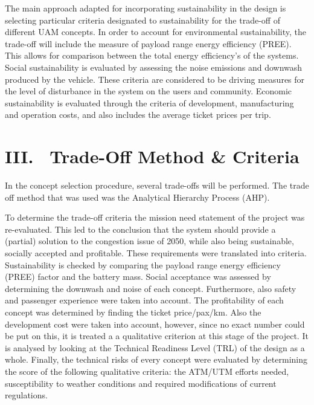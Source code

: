 The main approach adapted for incorporating sustainability in the design is selecting particular criteria designated to sustainability for the trade-off of different UAM concepts. In order to account for environmental sustainability, the trade-off will include the measure of payload range energy efficiency (PREE). This allows for comparison between the total energy efficiency's of the systems. Social sustainability is evaluated by assessing the noise emissions and downwash produced by the vehicle. These criteria are considered to be driving measures for the level of disturbance in the system on the users and community. Economic sustainability is evaluated through the criteria of development, manufacturing and operation costs, and also includes the average ticket prices per trip.


\section*{III. \ Trade-Off Method \& Criteria}
\label{ES.TOmethodcriteria}

In the concept selection procedure, several trade-offs will be performed. The trade off method that was used was the Analytical Hierarchy Process (AHP).

To determine the trade-off criteria the mission need statement of the project was re-evaluated. This led to the conclusion that the system should provide a (partial) solution to the congestion issue of 2050, while also being sustainable, socially accepted and profitable. These requirements were translated into criteria. Sustainability is checked by comparing the payload range energy efficiency (PREE) factor and the battery mass. Social acceptance was assessed by determining the downwash and noise of each concept. Furthermore, also safety and passenger experience were taken into account. The profitability of each concept was determined by finding the ticket price/pax/km. Also the development cost were taken into account, however, since no exact number could be put on this, it is treated a a qualitative criterion at this stage of the project. It is analysed by looking at the Technical Readiness Level (TRL) of the design as a whole. Finally, the technical risks of every concept were evaluated by determining the score of the following qualitative criteria: the ATM/UTM efforts needed, susceptibility to weather conditions and required modifications of current regulations. 


